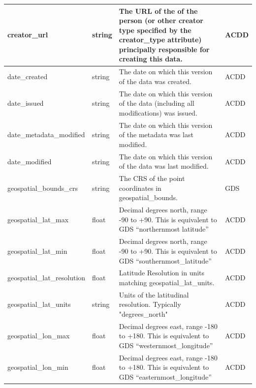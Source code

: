 \begin{longtable}{|p{}|p{}|p{}|p{}|}
\rowcolor{cyan!25} 
creator\_url & string & The URL of the of the person (or other creator type specified by the creator\_type attribute) principally responsible for creating this data. & ACDD \\ \hline

\rowcolor{cyan!25} 
date\_created & string & The date on which this version of the data was created. & ACDD \\ \hline

\rowcolor{cyan!25} 
date\_issued & string & The date on which this version of the data (including all modifications) was issued. & ACDD \\ \hline

\rowcolor{cyan!25} 
date\_metadata\_modified & string & The date on which this version of the metadata was last modified. & ACDD \\ \hline

\rowcolor{cyan!25} 
date\_modified & string & The date on which this version of the data was last modified. & ACDD \\ \hline

\rowcolor{cyan!25} 
geospatial\_bounds\_crs & string & The CRS of the point coordinates in geospatial\_bounds. & GDS \\ \hline

\rowcolor{cyan!25} 
geospatial\_lat\_max & float & Decimal degrees north, range -90 to +90.  This is equivalent to GDS “northernmost latitude” & ACDD \\ \hline

\rowcolor{cyan!25} 
geospatial\_lat\_min & float & Decimal degrees north, range -90 to +90.  This is equivalent to GDS “southernmost\_latitude” & ACDD \\ \hline

\rowcolor{cyan!25} 
geospatial\_lat\_resolution & float & Latitude Resolution in units matching geospatial\_lat\_units. & ACDD \\ \hline

\rowcolor{cyan!25} 
geospatial\_lat\_units & string & Units of the latitudinal resolution. Typically "degrees\_north" & ACDD \\ \hline

\rowcolor{cyan!25} 
geospatial\_lon\_max & float & Decimal degrees east, range -180 to +180.  This is equivalent to GDS “westernmost\_longitude” & ACDD \\ \hline

\rowcolor{cyan!25} 
geospatial\_lon\_min & float & Decimal degrees east, range -180 to +180.  This is equivalent to GDS “easternmost\_longitude” & ACDD \\ \hline


\end{longtable}
